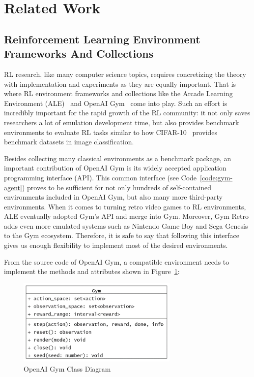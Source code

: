 \section{Related Work}

\subsection{Reinforcement Learning Environment Frameworks And Collections}
RL research, like many computer science topics, requires concretizing the theory with implementation and experiments as they are equally important. That is where RL environment frameworks and collections like the Arcade Learning Environment (ALE)~\parencite{ale} and OpenAI Gym~\parencite{openai-gym} come into play. Such an effort is incredibly important for the rapid growth of the RL community: it not only saves researchers a lot of emulation development time, but also provides benchmark environments to evaluate RL tasks similar to how CIFAR-10~\parencite{cifar-10} provides benchmark datasets in image classification.

Besides collecting many classical environments as a benchmark package, an important contribution of OpenAI Gym is its widely accepted application programming interface (API). This common interface (see Code~\ref{code:gym-agent}) proves to be sufficient for not only hundreds of self-contained environments included in OpenAI Gym, but also many more third-party environments. When it comes to turning retro video games to RL environments, ALE eventually adopted Gym's API and merge into Gym. Moreover, Gym Retro \parencite{gym-retro} adds even more emulated systems such as Nintendo Game Boy and Sega Genesis to the Gym ecosystem. Therefore, it is safe to say that following this interface gives us enough flexibility to implement most of the desired environments.

From the source code of OpenAI Gym, a compatible environment needs to implement the methods and attributes shown in Figure~\ref{fig:gym-class}:

\begin{figure}[H]
    \centering
    \includegraphics[width=0.7\textwidth]{images/gym-class.png}
    \caption{OpenAI Gym Class Diagram}
    \label{fig:gym-class}
\end{figure}


